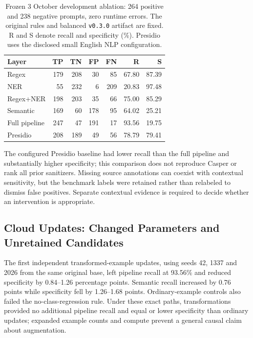 \documentclass[conference]{IEEEtran}
\begin{document}
\begin{table}[t]
\centering
\caption{Frozen 3 October development ablation: 264 positive and 238 negative prompts, zero runtime errors. The original rules and balanced \texttt{v0.3.0} artifact are fixed. R and S denote recall and specificity (\%). Presidio uses the disclosed small English NLP configuration.}
\label{tab:layer_results}
\small
\setlength{\tabcolsep}{3pt}
\begin{tabular}{lrrrrrr}
\hline
Layer & TP & TN & FP & FN & R & S \\
\hline
Regex & 179 & 208 & 30 & 85 & 67.80 & 87.39 \\
NER & 55 & 232 & 6 & 209 & 20.83 & 97.48 \\
Regex+NER & 198 & 203 & 35 & 66 & 75.00 & 85.29 \\
Semantic & 169 & 60 & 178 & 95 & 64.02 & 25.21 \\
Full pipeline & 247 & 47 & 191 & 17 & 93.56 & 19.75 \\
Presidio & 208 & 189 & 49 & 56 & 78.79 & 79.41 \\
\hline
\end{tabular}
\end{table}

The configured Presidio baseline had lower recall than the full pipeline and substantially higher specificity; this comparison does not reproduce Casper or rank all prior sanitizers. Missing source annotations can coexist with contextual sensitivity, but the benchmark labels were retained rather than relabeled to dismiss false positives. Separate contextual evidence is required to decide whether an intervention is appropriate.

\subsection{Cloud Updates: Changed Parameters and Unretained Candidates}

The first independent transformed-example updates, using seeds 42, 1337 and 2026 from the same original base, left pipeline recall at 93.56\% and reduced specificity by 0.84--1.26 percentage points. Semantic recall increased by 0.76 points while specificity fell by 1.26--1.68 points. Ordinary-example controls also failed the no-class-regression rule. Under these exact paths, transformations provided no additional pipeline recall and equal or lower specificity than ordinary updates; expanded example counts and compute prevent a general causal claim about augmentation.
\end{document}
